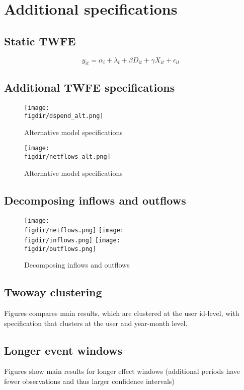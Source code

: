 
\section{Additional specifications}%
\label{sec:additional_specifications}


\subsection{Static TWFE}%
\label{sub:static_results}
\begin{equation}
    y_{it} = \alpha_i + \lambda_t + \beta D_{it} + \gamma X_{it} + \epsilon_{it}
\end{equation}



\subsection{Additional TWFE specifications}%
\label{sub:additional_twfe_specifications}
\begin{figure}[H]
    \centering
    \caption{Alternative model specifications}%
    \texttt{[image: \\figdir/dspend\_alt.png]}
\end{figure}

\begin{figure}[H]
    \centering
    \caption{Alternative model specifications}%
    \texttt{[image: \\figdir/netflows\_alt.png]}
\end{figure}



\subsection{Decomposing inflows and outflows}%
\label{sub:decomposing_inflows_and_outflows}
\begin{figure}[H]
    \centering
    \caption{Decomposing inflows and outflows}%
    \label{fig:inout}
    \texttt{[image: \\figdir/netflows.png]}
    \texttt{[image: \\figdir/inflows.png]}
    \texttt{[image: \\figdir/outflows.png]}
\end{figure}



\subsection{Twoway clustering}%
\label{sub:twoway_clustering}
Figures compares main results, which are clustered at the user id-level, with
specification that clusters at the user and year-month level.

\subsection{Longer event windows}%
\label{sub:longer_event_windows}
Figures show main results for longer effect windows (additional periods have
fewer observations and thus larger confidence intervals)

